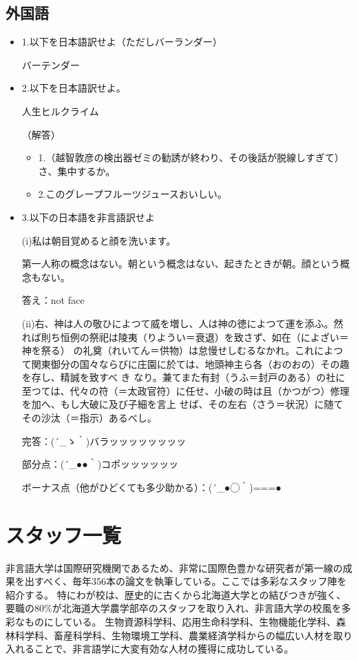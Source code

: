 \subsection{外国語}
\begin{itemize}
\item 1.以下を日本語訳せよ（ただしバーランダー）
\par
バーテンダー
\item 2.以下を日本語訳せよ。\par
人生ヒルクライム

\par（解答）

\begin{itemize}
\item 1.（越智敦彦の検出器ゼミの勧誘が終わり、その後話が脱線しすぎて）さ、集中するか。
\item 2.このグレープフルーツジュースおいしい。
\end{itemize}

\item 3.以下の日本語を非言語訳せよ\par
(i)私は朝目覚めると顔を洗います。\par
第一人称の概念はない。朝という概念はない、起きたときが朝。顔という概念もない。\par
答え：not face

(ii)右、神は人の敬ひによつて威を増し、人は神の徳によつて運を添ふ。然れば則ち恒例の祭祀は陵夷（りようい＝衰退）を致さず、如在（によざい＝神を祭る） の礼奠（れいてん＝供物）は怠慢せしむるなかれ。これによつて関東御分の国々ならびに庄園に於ては、地頭神主ら各（おのおの）その趣を存し、精誠を致すべ き なり。兼てまた有封（うふ＝封戸のある）の社に至つては、代々の符（＝太政官符）に任せ、小破の時は且（かつがつ）修理を加へ、もし大破に及び子細を言上 せば、その左右（さう＝状況）に随てその沙汰（＝指示）あるべし。\par

完答：(´\_ゝ｀)バラッッッッッッッッ \par
部分点：(´\_●●｀)コポッッッッッッ\par
ボーナス点（他がひどくても多少助かる）：(´\_●◯｀)===●

\end{itemize}

\section{スタッフ一覧}
非言語大学は国際研究機関であるため、非常に国際色豊かな研究者が第一線の成果を出すべく、毎年356本の論文を執筆している。ここでは多彩なスタッフ陣を紹介する。
特にわが校は、歴史的に古くから北海道大学との結びつきが強く、要職の80\%が北海道大学農学部卒のスタッフを取り入れ、非言語大学の校風を多彩なものにしている。
生物資源科学科、応用生命科学科、生物機能化学科、森林科学科、畜産科学科、生物環境工学科、農業経済学科からの幅広い人材を取り入れることで、非言語学に大変有効な人材の獲得に成功している。

